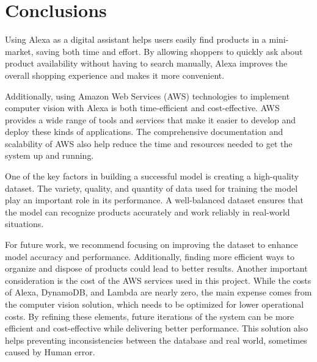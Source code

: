 \section{Conclusions}

Using Alexa as a digital assistant helps users easily find products in a mini-market, saving both time and effort. By allowing shoppers to quickly ask about product availability without having to search manually, Alexa improves the overall shopping experience and makes it more convenient.

Additionally, using Amazon Web Services (AWS) technologies to implement computer vision with Alexa is both time-efficient and cost-effective. AWS provides a wide range of tools and services that make it easier to develop and deploy these kinds of applications. The comprehensive documentation and scalability of AWS also help reduce the time and resources needed to get the system up and running.

One of the key factors in building a successful model is creating a high-quality dataset. The variety, quality, and quantity of data used for training the model play an important role in its performance. A well-balanced dataset ensures that the model can recognize products accurately and work reliably in real-world situations. 

For future work, we recommend focusing on improving the dataset to enhance model accuracy and performance. Additionally, finding more efficient ways to organize and dispose of products could lead to better results. Another important consideration is the cost of the AWS services used in this project. While the costs of Alexa, DynamoDB, and Lambda are nearly zero, the main expense comes from the computer vision solution, which needs to be optimized for lower operational costs. By refining these elements, future iterations of the system can be more efficient and cost-effective while delivering better performance. This solution also helps preventing inconsistencies between the database and real world, sometimes caused by Human error. 